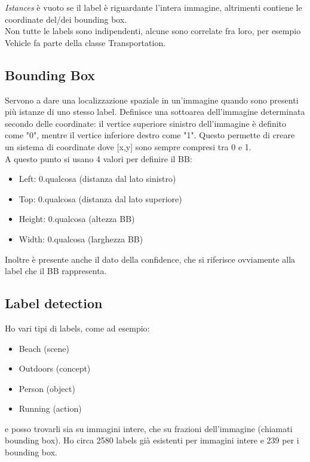 \documentclass{classes/base}
\begin{document}
    \textit{Istances} è vuoto se il label è
                        riguardante l'intera immagine, altrimenti 
                        contiene le coordinate del/dei bounding box.\\
    Non tutte le labels sono indipendenti, alcune sono correlate fra loro, per esempio Vehicle fa parte della classe Transportation.

    \subsection*{Bounding Box}
    Servono a dare una localizzazione spaziale in un'immagine quando sono presenti più istanze di uno stesso label.
    Definisce una sottoarea dell'immagine determinata secondo delle coordinate: il vertice superiore sinistro dell'immagine è definito come "0", mentre il vertice inferiore destro come "1". 
    Questo permette di creare un sistema di coordinate dove [x,y] sono sempre compresi tra 0 e 1. \\
    A questo punto si usano 4 valori per definire il BB: 
    \begin{itemize}
        \item Left: 0.qualcosa (distanza dal lato sinistro)
        \item Top: 0.qualcosa (distanza dal lato superiore)  
        \item Height: 0.qualcosa (altezza BB)
        \item Width: 0.qualcosa (larghezza BB)
    \end{itemize}
    Inoltre è presente anche il dato della confidence, che si riferisce ovviamente alla label che il BB rappresenta.

    \subsection*{Label detection}
    Ho vari tipi di labels, come ad esempio: 
    \begin{itemize}
        \item Beach (scene)
        \item Outdoors (concept)
        \item Person (object)
        \item Running (action)
    \end{itemize}
    e posso trovarli sia su immagini intere, che su frazioni dell'immagine (chiamati bounding box). 
    Ho circa 2580 labels già esistenti per immagini intere e 239 per i bounding box.
\end{document}
